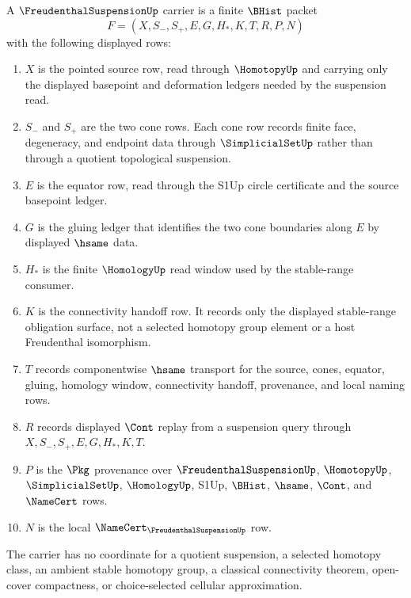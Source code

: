 \begin{definition}
\label{def:freudenthal-suspension-carrier}
A $\FreudenthalSuspensionUp$ carrier is a finite $\BHist$ packet
$$
F=(X,S_-,S_+,E,G,H_*,K,T,R,P,N)
$$
with the following displayed rows:
\begin{enumerate}
\item $X$ is the pointed source row, read through $\HomotopyUp$ and carrying only the displayed basepoint and deformation ledgers needed by the suspension read.
\item $S_-$ and $S_+$ are the two cone rows. Each cone row records finite face, degeneracy, and endpoint data through $\SimplicialSetUp$ rather than through a quotient topological suspension.
\item $E$ is the equator row, read through the S1Up circle certificate and the source basepoint ledger.
\item $G$ is the gluing ledger that identifies the two cone boundaries along $E$ by displayed $\hsame$ data.
\item $H_*$ is the finite $\HomologyUp$ read window used by the stable-range consumer.
\item $K$ is the connectivity handoff row. It records only the displayed stable-range obligation surface, not a selected homotopy group element or a host Freudenthal isomorphism.
\item $T$ records componentwise $\hsame$ transport for the source, cones, equator, gluing, homology window, connectivity handoff, provenance, and local naming rows.
\item $R$ records displayed $\Cont$ replay from a suspension query through $X,S_-,S_+,E,G,H_*,K,T$.
\item $P$ is the $\Pkg$ provenance over $\FreudenthalSuspensionUp$, $\HomotopyUp$, $\SimplicialSetUp$, $\HomologyUp$, S1Up, $\BHist$, $\hsame$, $\Cont$, and $\NameCert$ rows.
\item $N$ is the local $\NameCert_{\FreudenthalSuspensionUp}$ row.
\end{enumerate}
The carrier has no coordinate for a quotient suspension, a selected homotopy class, an ambient stable homotopy group, a classical connectivity theorem, open-cover compactness, or choice-selected cellular approximation.
\end{definition}

